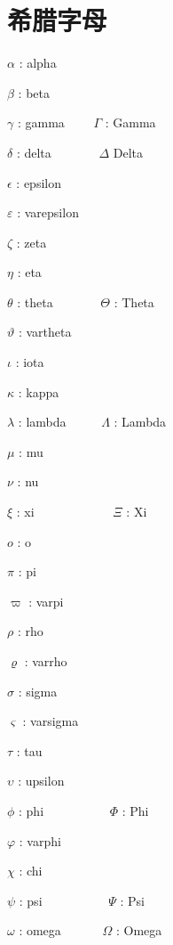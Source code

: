 \documentclass[UTF8]{ctexart}
\begin{document}
\section{希腊字母}

$\alpha$ : alpha \par
$\beta$ : beta \par
$\gamma$ : gamma \ \ \ \ $\Gamma$ : Gamma\par
$\delta$ : delta \ \ \ \ \ \ \ $\Delta$ Delta \par
$\epsilon$ : epsilon \par
$\varepsilon$ : varepsilon\par
$\zeta$ : zeta\par
$\eta$ : eta \par
$\theta$ : theta \ \ \ \ \ \ \ $\Theta$ : Theta\par
$\vartheta$ : vartheta \par
$\iota$ : iota \par
$\kappa$ : kappa \par
$\lambda$ : lambda \ \ \ \ \ $\Lambda$ : Lambda\par
$\mu$ : mu\par
$\nu$ : nu\par
$\xi$ : xi \ \ \ \ \ \ \ \ \ \ \ \ $\Xi$ : Xi\par
$o$ : o\par
$\pi$ : pi \par
$\varpi$ : varpi \par
$\rho$ : rho\par
$\varrho$ : varrho \par
$\sigma$ : sigma \par
$\varsigma$ : varsigma \par
$\tau$ : tau \par
$\upsilon$ : upsilon \par
$\phi$ : phi \ \ \ \ \ \ \ \ \ \ $\Phi$ : Phi\par
$\varphi$ : varphi \par
$\chi$ : chi\par
$\psi$ : psi \ \ \ \ \ \ \ \ \ \ $\Psi$ : Psi\par
$\omega$ : omega \ \ \ \ \ \ $\Omega$ : Omega\par

\newpage
\end{document}
